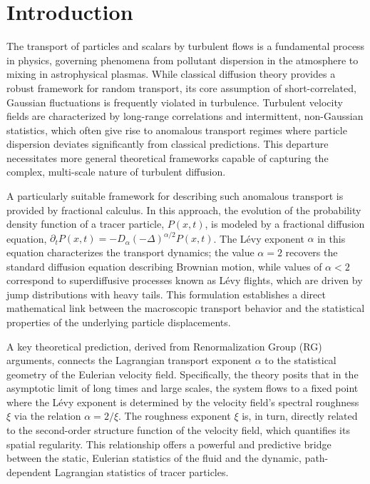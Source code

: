 \documentclass[]{article}
\begin{document}
\section{Introduction}
\label{sec:intro}
The transport of particles and scalars by turbulent flows is a fundamental process in physics, governing phenomena from pollutant dispersion in the atmosphere to mixing in astrophysical plasmas. While classical diffusion theory provides a robust framework for random transport, its core assumption of short-correlated, Gaussian fluctuations is frequently violated in turbulence. Turbulent velocity fields are characterized by long-range correlations and intermittent, non-Gaussian statistics, which often give rise to anomalous transport regimes where particle dispersion deviates significantly from classical predictions. This departure necessitates more general theoretical frameworks capable of capturing the complex, multi-scale nature of turbulent diffusion.

A particularly suitable framework for describing such anomalous transport is provided by fractional calculus. In this approach, the evolution of the probability density function of a tracer particle, $P(x,t)$, is modeled by a fractional diffusion equation, $\partial_t P(x,t) = -D_\alpha(-\Delta)^{\alpha/2} P(x,t)$. The Lévy exponent $\alpha$ in this equation characterizes the transport dynamics; the value $\alpha=2$ recovers the standard diffusion equation describing Brownian motion, while values of $\alpha < 2$ correspond to superdiffusive processes known as Lévy flights, which are driven by jump distributions with heavy tails. This formulation establishes a direct mathematical link between the macroscopic transport behavior and the statistical properties of the underlying particle displacements.

A key theoretical prediction, derived from Renormalization Group (RG) arguments, connects the Lagrangian transport exponent $\alpha$ to the statistical geometry of the Eulerian velocity field. Specifically, the theory posits that in the asymptotic limit of long times and large scales, the system flows to a fixed point where the Lévy exponent is determined by the velocity field's spectral roughness $\xi$ via the relation $\alpha = 2/\xi$. The roughness exponent $\xi$ is, in turn, directly related to the second-order structure function of the velocity field, which quantifies its spatial regularity. This relationship offers a powerful and predictive bridge between the static, Eulerian statistics of the fluid and the dynamic, path-dependent Lagrangian statistics of tracer particles.
\end{document}

